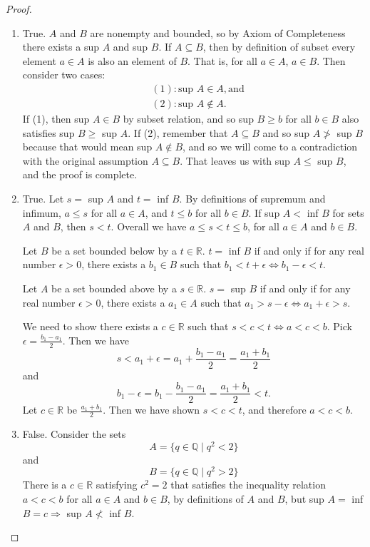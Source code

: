 \documentclass[11pt,twoside, reqno, align]{amsart}
\theoremstyle{remark}
\def\R{\mathbb R}
\def\Q{\mathbb Q}
\renewcommand{\implies}{\Rightarrow}
\renewcommand{\iff}{\Leftrightarrow}
\begin{document}
\begin{proof}\;
\begin{enumerate}[label=(\alph*)]
    \item True. $A$ and $B$ are nonempty and bounded, so by Axiom of Completeness there exists a sup $A$ and sup $B$. If $A \subseteq B$, then by definition of subset every element $a \in A$ is also an element of $B$. That is, for all $a \in A$, $a \in B$. Then consider two cases:
    \begin{align*}
        & (1): \text{sup } A \in A, \text{and} \\
        & (2): \text{sup } A \not \in A.
    \end{align*}
    If (1), then sup $A \in B$ by subset relation, and so sup $B \geq b$ for all $b \in B$ also satisfies sup $B \geq$ sup $A$. If (2), remember that $A \subseteq B$ and so sup $A \not >$ sup $B$ because that would mean sup $A \not \in B$, and so we will come to a contradiction with the original assumption $A \subseteq B$. That leaves us with sup $A \leq $ sup $B$, and the proof is complete.
    \item True. Let $s =$ sup $A$ and $t =$ inf $B$. By definitions of supremum and infimum, $a \leq s$ for all $a \in A$, and $t \leq b$ for all $b \in B$. If sup $A <$ inf $B$ for sets $A$ and $B$, then $s < t$. Overall we have $a \leq s < t \leq b$, for all $a \in A$ and $b \in B$.
    
    \newtheorem{Lm}[Variation of Lemma 1.3.8]: Let $B$ be a set bounded below by a $t \in \R$. $t =$ inf $B$ if and only if for any real number $\epsilon > 0$, there exists a $b_1 \in B$ such that $b_1 < t + \epsilon \iff b_1 - \epsilon < t$.
    
    \newtheorem{Lm}[Lemma 1.3.8]: Let $A$ be a set bounded above by a $s \in \R$. $s =$ sup $B$ if and only if for any real number $\epsilon > 0$, there exists a $a_1 \in A$ such that $a_1 > s - \epsilon \iff a_1 + \epsilon > s$.
    
    We need to show there exists a $c \in \R$ such that $s < c < t \iff a < c < b$. Pick $\epsilon = \frac{b_1 - a_1}{2}$. Then we have $$
    s < a_1 + \epsilon = a_1 + \frac{b_1 - a_1}{2} = \frac{a_1 + b_1}{2}
    $$
    and 
    $$
    b_1 - \epsilon = b_1 - \frac{b_1 - a_1}{2} = \frac{a_1 + b_1}{2} < t.
    $$
    Let $c \in \R$ be $\frac{a_1 + b_1}{2}$. Then we have shown $s < c < t$, and therefore $a < c < b$.
    \item False. Consider the sets
    $$
    A = \{q \in \Q \mid q^2 < 2\}
    $$
    and 
    $$
    B = \{q \in \Q \mid q^2 > 2\}
    $$
    There is a $c \in \R$ satisfying $c^2 = 2$ that satisfies the inequality relation $a < c <b$ for all $a \in A$ and $b \in B$, by definitions of $A$ and $B$, but sup $A =$ inf $B = c \implies$ sup $A \not <$ inf $B$.
\end{enumerate}
\end{proof}
\end{document}

